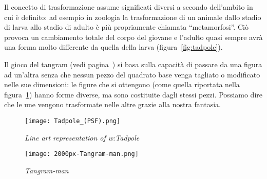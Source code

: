 

Il concetto di trasformazione assume significati diversi a secondo dell'ambito in cui è definito: ad esempio in zoologia la trasformazione di un animale dallo stadio di larva allo stadio di adulto è più propriamente chiamata ``metamorfosi''. Ciò provoca un cambiamento totale del corpo del giovane e l'adulto quasi sempre avrà una forma molto differente da quella della larva (figura~\ref{fig:tadpole}).

Il gioco del tangram (vedi pagina~\pageref{tangram}) si basa sulla capacità di passare da una figura ad un'altra senza che nessun pezzo del quadrato base venga tagliato o modificato nelle sue dimensioni: le figure che si ottengono (come quella riportata nella figura~\ref{fig:tangramman}) hanno forme diverse, ma sono costituite dagli stessi pezzi. Possiamo dire che le une vengono trasformate nelle altre grazie alla nostra fantasia.

\begin{figure}[!htb]
\begin{center}
 \noindent\begin{minipage}{0.6\textwidth}
   \centering
   \texttt{[image: Tadpole\_(PSF).png]}
   \caption{\emph{Line art representation of w:Tadpole}\protect\footnotemark}\label{fig:tadpole}
 \end{minipage}
\hspace{7mm}
 \noindent\begin{minipage}{0.26\textwidth}
  \centering
   \texttt{[image: 2000px-Tangram-man.png]}
   \caption{\emph{Tangram-man}\protect\footnotemark}\label{fig:tangramman}
 \end{minipage}
\end{center}
\end{figure}

